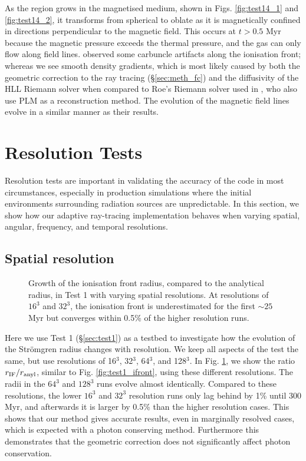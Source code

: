 \documentclass[useAMS,usenatbib]{mn2e}
\begin{document}
As the \hii region grows in the magnetised medium, shown in
Figs. \ref{fig:test14_1} and \ref{fig:test14_2}, it transforms from
spherical to oblate as it is magnetically confined in directions
perpendicular to the magnetic field.  This occurs at $t > 0.5$ Myr
because the magnetic pressure exceeds the thermal pressure, and the
gas can only flow along field lines.  \citeauthor{Krumholz07_ART}
observed some carbuncle artifacts along the ionisation front; whereas
we see smooth density gradients, which is most likely caused by both
the geometric correction to the ray tracing (\S\ref{sec:meth_fc}) and
the diffusivity of the HLL Riemann solver when compared to Roe's
Riemann solver used in \citet{Krumholz07_ART}, who also use PLM as a
reconstruction method.  The evolution of the magnetic field lines
evolve in a similar manner as their results.

\section{Resolution Tests}

Resolution tests are important in validating the accuracy of the code
in most circumstances, especially in production simulations where the
initial environments surrounding radiation sources are unpredictable.
In this section, we show how our adaptive ray-tracing implementation
behaves when varying spatial, angular, frequency, and temporal
resolutions.

\subsection{Spatial resolution}
\label{sec:dx_dep}

\begin{figure}
  \caption{\label{fig:dx_dep1} Growth of the ionisation front radius,
    compared to the analytical radius, in Test 1 with varying spatial
    resolutions.  At resolutions of $16^3$ and $32^3$, the ionisation
    front is underestimated for the first $\sim25$ Myr but converges
    within 0.5\% of the higher resolution runs.}
\end{figure}

Here we use Test 1 (\S\ref{sec:test1}) as a testbed to investigate how
the evolution of the Str\"{o}mgren radius changes with resolution.  We
keep all aspects of the test the same, but use resolutions of 16$^3$,
32$^3$, 64$^3$, and 128$^3$.  In Fig. \ref{fig:dx_dep1}, we show the
ratio $r_{\rm IF}/r_{\rm anyl}$, similar to Fig.
\ref{fig:test1_ifront}, using these different resolutions.  The radii
in the $64^3$ and $128^3$ runs evolve almost identically.  Compared to
these resolutions, the lower $16^3$ and $32^3$ resolution runs only
lag behind by 1\% until 300 Myr, and afterwards it is larger by 0.5\%
than the higher resolution cases.  This shows that our method gives
accurate results, even in marginally resolved cases, which is expected
with a photon conserving method.  Furthermore this demonstrates that
the geometric correction does not significantly affect photon
conservation.
\end{document}
